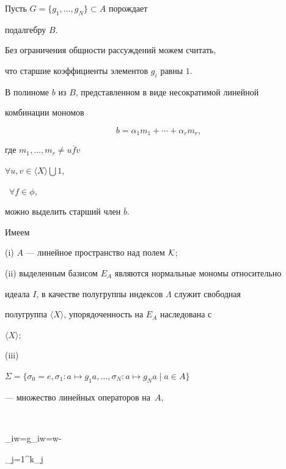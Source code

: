 Пусть $G=\lbrace g_{1},\dotsc,g_{N}\rbrace\subset A$ порождает


подалгебру $B$. 




Без ограничения общности рассуждений можем считать,


что старшие коэффициенты элементов $g_{i}$ равны $1$.








В полиноме $b$ из $B$, представленном в виде несократимой линейной


комбинации мономов


$$


b=\alpha_{1}m_{1}+\dotsb+\alpha_{r}m_{r},


$$


где $m_{1},\dotsc,m_{r}\ne u\overline{f} v$ \


$\forall u,v\in\langle X\rangle\bigcup 1$,


\ $\forall f\in\phi$, 


можно выделить старший член $\overline{b}$.








Имеем





(i) $A$ --- линейное пространство над полем ${\cal K}$;





(ii) выделенным базисом $E_{A}$ являются нормальные мономы относительно


идеала $I$, в качестве полугруппы индексов $\Lambda$ служит свободная


полугруппа $\langle X\rangle$, упорядоченность на $E_{A}$ наследована с


$\langle X\rangle$;





(iii)


$\Sigma=\lbrace\sigma_{0}=e,\sigma_{1}:a\mapsto g_{1}a,


\dotsc,\sigma_{N}:a\mapsto g_{N}a\mid a\in A\rbrace$


--- множество линейных операторов на~$A$,


$$


\sigma_{i}w=g_{i}w=w-


\sum\limits_{j=1}^{k}\beta_{j}


